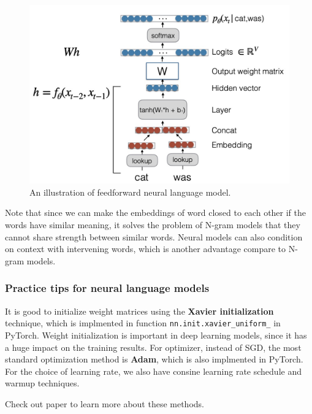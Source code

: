 \documentclass[a4paper]{article}
\begin{document}
\begin{figure}
  \centering
  \includegraphics[width=0.6\linewidth]{figs/forward-nn-lm.jpg}
  \caption{An illustration of feedforward neural language 
  model.}
  \label{feedforward-nn-lm}
\end{figure}

Note that since we can make the embeddings of word closed to 
each other if the words have similar meaning, it solves the 
problem of N-gram models that they cannot share strength 
between similar words. Neural models can also condition 
on context with intervening words, which is another advantage
compare to N-gram models.

\subsubsection{Practice tips for neural language models}
It is good to initialize weight matrices
using the \textbf{Xavier initialization} technique, which is 
implmented in function \texttt{nn.init.xavier\_uniform\_} 
in PyTorch. Weight initialization
is important in deep learning models, since it has a huge 
impact on the training results. 
For optimizer, instead of SGD, the most 
standard optimization method is \textbf{Adam}, 
which is also implmented in PyTorch. 
For the choice of learning rate, 
we also have consine learning rate schedule and warmup 
techniques.

Check out paper to learn more about these methods.
\end{document}
